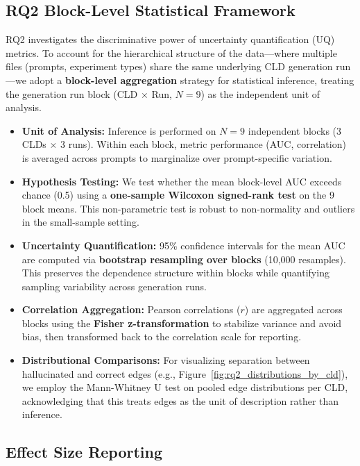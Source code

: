 \subsection{RQ2 Block-Level Statistical Framework}
\label{sec:rq2_stats}

RQ2 investigates the discriminative power of uncertainty quantification (UQ) metrics. To account for the hierarchical structure of the data---where multiple files (prompts, experiment types) share the same underlying CLD generation run---we adopt a \textbf{block-level aggregation} strategy for statistical inference, treating the generation run block (CLD $\times$ Run, $N=9$) as the independent unit of analysis.

\begin{itemize}[noitemsep]
    \item \textbf{Unit of Analysis:} Inference is performed on $N=9$ independent blocks (3 CLDs $\times$ 3 runs). Within each block, metric performance (AUC, correlation) is averaged across prompts to marginalize over prompt-specific variation.
    \item \textbf{Hypothesis Testing:} We test whether the mean block-level AUC exceeds chance (0.5) using a \textbf{one-sample Wilcoxon signed-rank test} on the 9 block means. This non-parametric test is robust to non-normality and outliers in the small-sample setting.
    \item \textbf{Uncertainty Quantification:} 95\% confidence intervals for the mean AUC are computed via \textbf{bootstrap resampling over blocks} (10,000 resamples). This preserves the dependence structure within blocks while quantifying sampling variability across generation runs.
    \item \textbf{Correlation Aggregation:} Pearson correlations ($r$) are aggregated across blocks using the \textbf{Fisher z-transformation} to stabilize variance and avoid bias, then transformed back to the correlation scale for reporting.
    \item \textbf{Distributional Comparisons:} For visualizing separation between hallucinated and correct edges (e.g., Figure~\ref{fig:rq2_distributions_by_cld}), we employ the Mann-Whitney U test on pooled edge distributions per CLD, acknowledging that this treats edges as the unit of description rather than inference.
\end{itemize}

\subsection{Effect Size Reporting}

